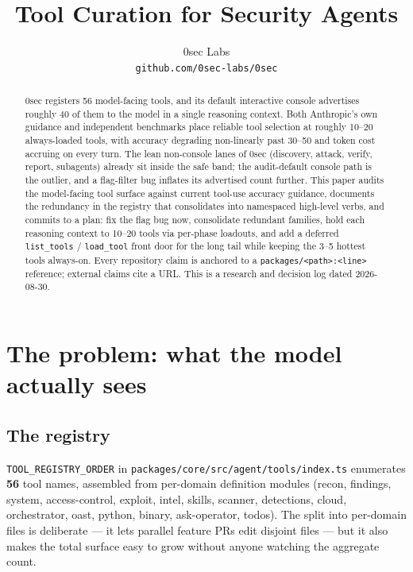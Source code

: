 \documentclass[11pt]{article}
\title{Tool Curation for Security Agents}
\author{
  0sec Labs \\
  \texttt{github.com/0sec-labs/0sec}
}
\date{}
\begin{document}
\maketitle

\begin{abstract}
0sec registers 56 model-facing tools, and its default interactive console
advertises roughly 40 of them to the model in a single reasoning context. Both
Anthropic's own guidance and independent benchmarks place reliable tool
selection at roughly 10--20 always-loaded tools, with accuracy degrading
non-linearly past 30--50 and token cost accruing on every turn. The lean
non-console lanes of 0sec (discovery, attack, verify, report, subagents) already
sit inside the safe band; the audit-default console path is the outlier, and a
flag-filter bug inflates its advertised count further. This paper audits the
model-facing tool surface against current tool-use accuracy guidance, documents
the redundancy in the registry that consolidates into namespaced high-level
verbs, and commits to a plan: fix the flag bug now, consolidate redundant
families, hold each reasoning context to 10--20 tools via per-phase loadouts,
and add a deferred \texttt{list\_tools} / \texttt{load\_tool} front door for the
long tail while keeping the 3--5 hottest tools always-on. Every repository claim
is anchored to a \texttt{packages/<path>:<line>} reference; external claims cite
a URL. This is a research and decision log dated 2026-08-30.
\end{abstract}

\section{The problem: what the model actually sees}

\subsection{The registry}

\texttt{TOOL\_REGISTRY\_ORDER} in \texttt{packages/core/src/agent/tools/index.ts}
enumerates \textbf{56} tool names, assembled from per-domain definition modules
(recon, findings, system, access-control, exploit, intel, skills, scanner,
detections, cloud, orchestrator, oast, python, binary, ask-operator, todos). The
split into per-domain files is deliberate --- it lets parallel feature PRs edit
disjoint files --- but it also makes the total surface easy to grow without
anyone watching the aggregate count.
\end{document}
